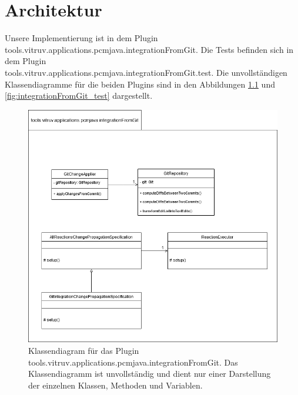 \chapter{Architektur}
\label{ch:Architektur}
Unsere Implementierung ist in dem Plugin tools.vitruv.applications.pcmjava.integrationFromGit. Die Tests befinden sich in dem Plugin\\ tools.vitruv.applications.pcmjava.integrationFromGit.test. Die unvollständigen Klassendiagramme für die beiden Plugins sind in den Abbildungen \ref{fig:integrationFromGit} und \ref{fig:integrationFromGit_test} dargestellt.

\begin{figure}[h]
\includegraphics[width=\textwidth]{pictures/integrationFromGit_diagram.png}
\caption{Klassendiagram für das Plugin tools.vitruv.applications.pcmjava.integrationFromGit. Das Klassendiagramm ist unvollständig und dient nur einer Darstellung der einzelnen Klassen, Methoden und Variablen.}
\label{fig:integrationFromGit}
\end{figure}

